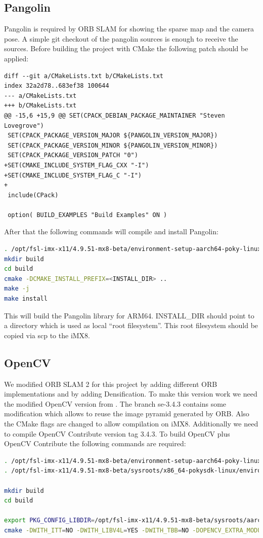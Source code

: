 \documentclass[11pt,a4paper,titlepage,oneside]{report}
\begin{document}
\subsection{Pangolin}
Pangolin \cite{pangolin} is required by ORB SLAM for showing the sparse map and the camera pose. A simple git checkout of the pangolin sources is enough to receive the sources. Before building the project with CMake the following patch should be applied:
\begin{lstlisting}
diff --git a/CMakeLists.txt b/CMakeLists.txt
index 32a2d78..683ef38 100644
--- a/CMakeLists.txt
+++ b/CMakeLists.txt
@@ -15,6 +15,9 @@ SET(CPACK_DEBIAN_PACKAGE_MAINTAINER "Steven Lovegrove")
 SET(CPACK_PACKAGE_VERSION_MAJOR ${PANGOLIN_VERSION_MAJOR})
 SET(CPACK_PACKAGE_VERSION_MINOR ${PANGOLIN_VERSION_MINOR})
 SET(CPACK_PACKAGE_VERSION_PATCH "0")
+SET(CMAKE_INCLUDE_SYSTEM_FLAG_CXX "-I")
+SET(CMAKE_INCLUDE_SYSTEM_FLAG_C "-I")
+
 include(CPack)
 
 option( BUILD_EXAMPLES "Build Examples" ON )
\end{lstlisting}

After that the following commands will compile and install Pangolin:
\begin{lstlisting}[language=bash]
. /opt/fsl-imx-x11/4.9.51-mx8-beta/environment-setup-aarch64-poky-linux
mkdir build
cd build
cmake -DCMAKE_INSTALL_PREFIX=<INSTALL_DIR> ..
make -j
make install
\end{lstlisting}

This will build the Pangolin library for ARM64. INSTALL\_DIR should point to a directory which is used as local ``root filesystem''. This root filesystem should be copied via scp to the iMX8.

\subsection{OpenCV}\label{sec:opencv}
We modified ORB SLAM 2 for this project by adding different ORB implementations and by adding Densification. To make this version work we need the modified OpenCV version from \cite{opencv_se}. The branch se-3.4.3 contains some modification which allows to reuse the image pyramid generated by ORB. Also the CMake flags are changed to allow compilation on iMX8. Additionally we need to compile OpenCV Contribute \cite{opencv_contrib} version tag 3.4.3. To build OpenCV plus OpenCV Contribute the following commands are required:
\begin{lstlisting}[language=bash]
. /opt/fsl-imx-x11/4.9.51-mx8-beta/environment-setup-aarch64-poky-linux
. /opt/fsl-imx-x11/4.9.51-mx8-beta/sysroots/x86_64-pokysdk-linux/environment-setup.d/cmake.sh

mkdir build
cd build

export PKG_CONFIG_LIBDIR=/opt/fsl-imx-x11/4.9.51-mx8-beta/sysroots/aarch64-poky-linux/usr/lib/pkgconfig/
cmake -DWITH_ITT=NO -DWITH_LIBV4L=YES -DWITH_TBB=NO -DOPENCV_EXTRA_MODULES_PATH=<path to OpenCV contrib> -DCMAKE_BUILD_TYPE=Release ..
\end{lstlisting}
\end{document}
